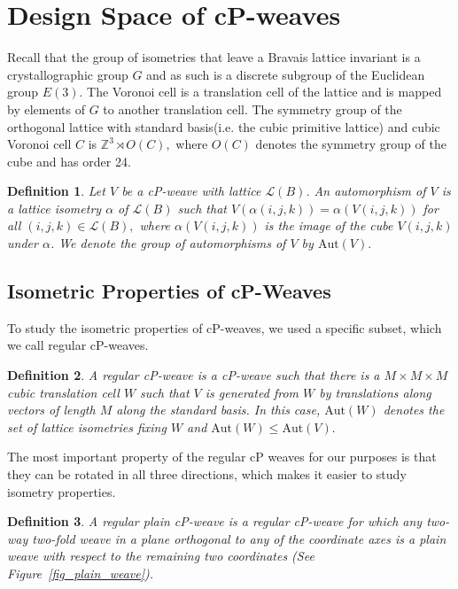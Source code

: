 \documentclass[unnumsec,webpdf,contemporary,large]{oup-authoring-template}%
\theoremstyle{thmstyleone}%
\theoremstyle{thmstyletwo}%
\theoremstyle{thmstylethree}%
\newtheorem{definition}{Definition}
\newcommand{\Z}{{\mathbb{Z}}}
\begin{document}
\section{Design Space of cP-weaves}

Recall that the group of isometries that leave a Bravais lattice invariant is a crystallographic group $G$ and as such is a discrete subgroup of the Euclidean group $E(3)$. The Voronoi cell is a translation cell of the lattice and is mapped by elements of $G$ to another translation cell. The symmetry group of the orthogonal lattice with standard basis(i.e. the cubic primitive lattice) and cubic Voronoi cell $C$ is $\Z^3 \rtimes O(C),$ where $O(C)$ denotes the symmetry group of the cube and has order 24.
\begin{definition}
Let $V$ be a cP-weave with lattice ${\mathcal L}(B)$. 
An automorphism of $V$ is
a lattice isometry  $\alpha$ of ${\mathcal L}(B)$ such that 
$V(\alpha(i,j,k))=\alpha(V(i,j,k))$ for all $(i,j,k)\in {\mathcal L}(B),$
where $\alpha(V(i,j,k))$ is the image of the cube $V(i,j,k)$ under $\alpha$. We denote the
group of automorphisms of $V$ by $\textrm{Aut}(V).$
\end{definition}





\subsection{Isometric Properties of cP-Weaves}

To study the isometric properties of cP-weaves, we used a specific subset, which we call regular cP-weaves. 

\begin{definition}
A \emph{regular cP-weave} is a  cP-weave such that there is a $M\times M \times M$ cubic translation cell $W$ such that $V$ is generated from $W$ by translations along vectors of length $M$ along the standard basis.
In this case, $\textrm{Aut}(W)$ denotes the set of lattice isometries fixing $W$ and $\textrm{Aut}(W)\le \textrm{Aut}(V).$
\label{regular_cP-weave}
\end{definition}

The most important property of the regular cP weaves for our purposes is that they can be rotated in all three directions, which makes it easier to study isometry properties. 

\begin{definition}\label{def:cP_plain}
  A \emph{regular plain cP-weave} is a regular cP-weave for which any two-way two-fold weave in a plane orthogonal to any of the coordinate axes is a plain weave with respect to the remaining two coordinates (See Figure~\ref{fig_plain_weave}).
\end{definition}
\end{document}
